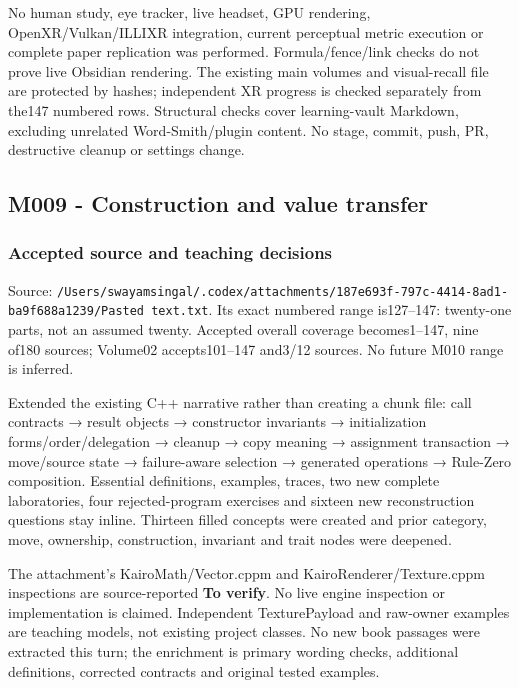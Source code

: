 No human study, eye tracker, live headset, GPU rendering, OpenXR/Vulkan/ILLIXR integration, current perceptual metric execution or complete paper replication was performed. Formula/fence/link checks do not prove live Obsidian rendering. The existing main volumes and visual-recall file are protected by hashes; independent XR progress is checked separately from the147 numbered rows. Structural checks cover learning-vault Markdown, excluding unrelated Word-Smith/plugin content. No stage, commit, push, PR, destructive cleanup or settings change.

\subsection{M009 - Construction and value transfer}\label{appendix-a103e7846d21-m009---construction-and-value-transfer}

\subsubsection{Accepted source and teaching decisions}\label{appendix-a103e7846d21-accepted-source-and-teaching-decisions}

Source: \texttt{/Users/swayamsingal/.codex/attachments/187e693f-797c-4414-8ad1-ba9f688a1239/Pasted\ text.txt}. Its exact numbered range is127--147: twenty-one parts, not an assumed twenty. Accepted overall coverage becomes1--147, nine of180 sources; Volume02 accepts101--147 and3/12 sources. No future M010 range is inferred.

Extended the existing C++ narrative rather than creating a chunk file: call contracts → result objects → constructor invariants → initialization forms/order/delegation → cleanup → copy meaning → assignment transaction → move/source state → failure-aware selection → generated operations → Rule-Zero composition. Essential definitions, examples, traces, two new complete laboratories, four rejected-program exercises and sixteen new reconstruction questions stay inline. Thirteen filled concepts were created and prior category, move, ownership, construction, invariant and trait nodes were deepened.

The attachment's KairoMath/Vector.cppm and KairoRenderer/Texture.cppm inspections are source-reported \textbf{To verify}. No live engine inspection or implementation is claimed. Independent TexturePayload and raw-owner examples are teaching models, not existing project classes. No new book passages were extracted this turn; the enrichment is primary wording checks, additional definitions, corrected contracts and original tested examples.

